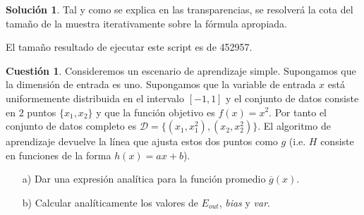 \documentclass[a4paper, 11pt]{article}
\theoremstyle{definition}
\newtheorem{cuestion}{Cuestión}
\newtheorem*{solucion}{Solución}
\begin{document}
  \begin{solucion}
    Tal y como se explica en las transparencias, se resolverá la cota del tamaño de la muestra iterativamente sobre la fórmula apropiada.

    

    El tamaño resultado de ejecutar este script es de 452957.
  \end{solucion}

  \begin{cuestion}
  Consideremos un escenario de aprendizaje simple. Supongamos que la dimensión de entrada es uno. Supongamos que la variable de entrada $x$ está uniformemente distribuida en el intervalo $[-1,1]$ y el conjunto de datos consiste en 2 puntos $\{x_1,x_2\}$ y que la función objetivo es $f(x)=x^2$. Por tanto el conjunto de datos completo es $\mathcal{D}=\{(x_1,x_1^2), (x_2,x_2^2)\}$. El algoritmo de aprendizaje devuelve la línea que ajusta estos dos puntos como $g$ (i.e. $H$ consiste en funciones de la forma $h(x)=ax+b$).
  \begin{enumerate}
  \item[a)] Dar una expresión analítica para la función promedio $\overline{g}(x)$.
  \item[b)] Calcular analíticamente los valores de $E_{out}$, \emph{bias} y \emph{var}.
  \end{enumerate}
  \end{cuestion}
\end{document}
